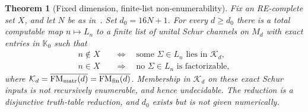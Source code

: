 \documentclass[11pt]{article}
\newtheorem{theorem}{Theorem}
\theoremstyle{definition}
\theoremstyle{remark}
\providecommand{\K}{\mathcal K}
\begin{document}
\begin{theorem}[Fixed dimension, finite-list non-enumerability]\label{fd-thm:fixed}
Fix an RE-complete set $X$, and let $N$ be as in~\cite[Thm.~7.2]{FMS}. Set $d_0=16N+1$. For every $d\ge d_0$ there is a total computable map $n\mapsto L_n$ to a finite list of unital Schur channels on $M_d$ with exact entries in $\mathbb K_0$ such that
\begin{align*}
n\notin X&\quad\Longleftrightarrow\quad
\text{some }\Sigma\in L_n\text{ lies in }\K_d,\\
n\in X&\quad\Longrightarrow\quad
\text{no }\Sigma\in L_n\text{ is factorizable},
\end{align*}
where $\K_d=\overline{\mathrm{FM}_{\rm matr}(d)}=\overline{\mathrm{FM}_{\rm fin}(d)}$. Membership in $\K_d$ on these exact Schur inputs is not recursively enumerable, and hence undecidable. The reduction is a disjunctive truth-table reduction, and $d_0$ exists but is not given numerically.
\end{theorem}
\end{document}
